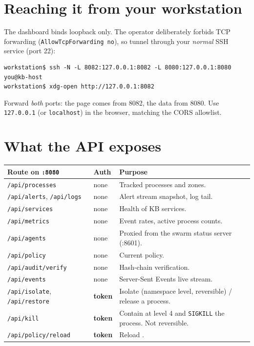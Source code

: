 \section{Reaching it from your workstation}
The dashboard binds loopback only. The operator  deliberately forbids TCP forwarding
(\texttt{AllowTcpForwarding no}), so tunnel through your \emph{normal} SSH service (port 22):
\begin{lstlisting}[style=console]
workstation$ ssh -N -L 8082:127.0.0.1:8082 -L 8080:127.0.0.1:8080 you@kb-host
workstation$ xdg-open http://127.0.0.1:8082
\end{lstlisting}
Forward \emph{both} ports: the page comes from 8082, the data from 8080. Use \texttt{127.0.0.1} (or
\texttt{localhost}) in the browser, matching the CORS allowlist.

\section{What the API exposes}
\begin{center}\small
\begin{tabularx}{\textwidth}{@{}L{4.2cm}L{1.6cm}Y@{}}
\toprule
\textbf{Route on \texttt{:8080}} & \textbf{Auth} & \textbf{Purpose}\\
\midrule
\texttt{/api/processes} & none & Tracked processes and zones.\\
\texttt{/api/alerts}, \texttt{/api/logs} & none & Alert stream snapshot, log tail.\\
\texttt{/api/services} & none & Health of KB services.\\
\texttt{/api/metrics} & none & Event rates, active process counts.\\
\texttt{/api/agents} & none & Proxied from the swarm status server (:8601).\\
\texttt{/api/policy} & none & Current policy.\\
\texttt{/api/audit/verify} & none & Hash-chain verification.\\
\texttt{/api/events} & none & Server-Sent Events live stream.\\
\texttt{/api/isolate}, \texttt{/api/restore} & \textbf{token} & Isolate (namespace level, reversible) / release a process.\\
\texttt{/api/kill} & \textbf{token} & Contain at level 4 and \texttt{SIGKILL} the process. Not reversible.\\
\texttt{/api/policy/reload} & \textbf{token} & Reload .\\
\bottomrule
\end{tabularx}
\end{center}
